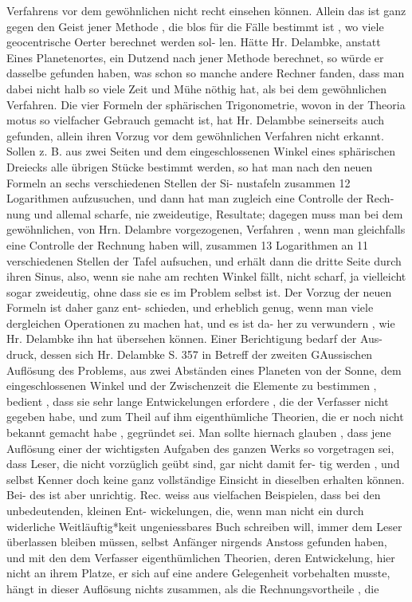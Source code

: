 \documentclass[12pt,a4paper]{article}
\begin{document}
Verfahrens  vor  dem  gewöhnlichen  nicht  recht  einsehen  können.  Allein  das  ist  ganz  gegen  den  Geist jener  Methode ,  die  blos  für  die  Fälle  bestimmt  ist ,  wo  viele  geocentrische  Oerter  berechnet  werden  sol- len. Hätte  Hr.  Delambke,  anstatt  Eines  Planetenortes,  ein  Dutzend  nach  jener  Methode  berechnet,  so würde  er  dasselbe  gefunden  haben,  was  schon  so  manche  andere  Rechner  fanden,  dass  man  dabei  nicht halb  so  viele  Zeit  und  Mühe  nöthig  hat,  als  bei  dem  gewöhnlichen  Verfahren.  Die  vier  Formeln  der sphärischen  Trigonometrie,  wovon  in  der  Theoria  motus  so  vielfacher  Gebrauch  gemacht  ist,  hat  Hr. Delambbe  seinerseits  auch  gefunden,  allein  ihren  Vorzug  vor  dem  gewöhnlichen  Verfahren  nicht  erkannt. Sollen  z.  B.  aus  zwei  Seiten  und  dem  eingeschlossenen  Winkel  eines  sphärischen  Dreiecks  alle  übrigen Stücke  bestimmt  werden,  so  hat  man  nach  den  neuen  Formeln  an  sechs  verschiedenen  Stellen  der  Si- nustafeln zusammen  12  Logarithmen  aufzusuchen,  und  dann  hat  man  zugleich  eine  Controlle  der  Rech- nung und  allemal  scharfe,  nie  zweideutige,  Resultate;  dagegen  muss  man  bei  dem  gewöhnlichen,  von Hrn.  Delambre  vorgezogenen,  Verfahren ,  wenn  man  gleichfalls  eine  Controlle  der  Rechnung  haben  will, zusammen  13  Logarithmen  an  11  verschiedenen  Stellen  der  Tafel  aufsuchen,  und  erhält  dann  die  dritte Seite  durch  ihren  Sinus,  also,  wenn  sie  nahe  am  rechten  Winkel  fällt,  nicht  scharf,  ja  vielleicht  sogar zweideutig,  ohne  dass  sie  es  im  Problem  selbst  ist.  Der  Vorzug  der  neuen  Formeln  ist  daher  ganz  ent- schieden, und  erheblich  genug,  wenn  man  viele  dergleichen  Operationen  zu  machen  hat,  und  es  ist  da- her zu  verwundern ,  wie  Hr.  Delambke  ihn  hat  übersehen  können.  Einer  Berichtigung  bedarf  der  Aus- druck, dessen  sich  Hr.  Delambke  S.  357  in  Betreff  der  zweiten  GAussischen  Auflösung  des  Problems,  aus zwei  Abständen  eines  Planeten  von  der  Sonne,  dem  eingeschlossenen  Winkel  und  der  Zwischenzeit  die Elemente  zu  bestimmen ,  bedient ,  dass  sie  sehr  lange  Entwickelungen  erfordere ,  die  der  Verfasser  nicht gegeben  habe,  und  zum  Theil  auf  ihm  eigenthümliche  Theorien,  die  er  noch  nicht  bekannt  gemacht habe ,  gegründet  sei.  Man  sollte  hiernach  glauben ,  dass  jene  Auflösung  einer  der  wichtigsten  Aufgaben des  ganzen  Werks  so  vorgetragen  sei,  dass  Leser,  die  nicht  vorzüglich  geübt  sind,  gar  nicht  damit  fer- tig werden ,  und  selbst  Kenner  doch  keine  ganz  vollständige  Einsicht  in  dieselben  erhalten  können.  Bei- des ist  aber  unrichtig.  Rec.  weiss  aus  vielfachen  Beispielen,  dass  bei  den  unbedeutenden,  kleinen  Ent- wickelungen, die,  wenn  man  nicht  ein  durch  widerliche  Weitläuftig*keit  ungeniessbares  Buch  schreiben will,  immer  dem  Leser  überlassen  bleiben  müssen,  selbst  Anfänger  nirgends  Anstoss  gefunden  haben, und  mit  den  dem  Verfasser  eigenthümlichen  Theorien,  deren  Entwickelung,  hier  nicht  an  ihrem  Platze, er  sich  auf  eine  andere  Gelegenheit  vorbehalten  musste,  hängt  in  dieser  Auflösung  nichts  zusammen, als  die  Rechnungsvortheile ,  die  
\end{document}
